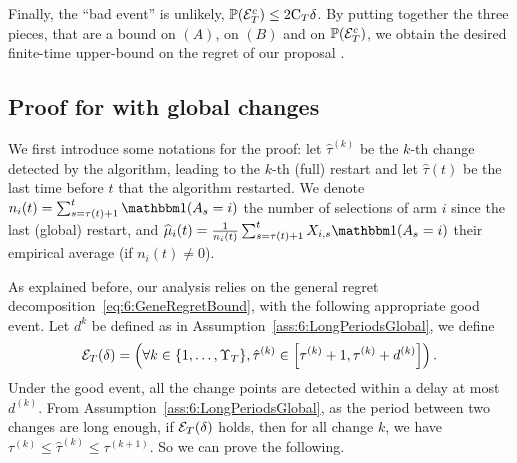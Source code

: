 Finally, the ``bad event'' is unlikely, $\mathbb{P}(\mathcal{E}_T^c) \leq 2\mathrm{C}_T \delta$.
By putting together the three pieces, that are a bound on $(A)$, on $(B)$ and on $\mathbb{P}(\mathcal{E}_T^c)$, we obtain the desired finite-time upper-bound on the regret of our proposal \GLRklUCB.





\subsection{Proof for \GLRklUCB{} with global changes}
\label{proof:6:mainRegretBoundGlobal}





We first introduce some notations for the proof:
let $\widehat{\tau}^{(k)}$ be the $k$-th change detected by the algorithm, leading to the $k$-th (full) restart and let $\widehat{\tau}(t)$ be the last time before $t$ that the algorithm restarted.
We denote $n_i(t) = \sum_{s=\tau(t)+1}^{t}\indic(A_s = i)$ the number of selections of arm $i$ since the last (global) restart, and $\widehat{\mu}_i(t) = \frac{1}{n_i(t)}\sum_{s=\tau(t)+1}^{t}X_{i,s}\indic(A_s = i)$ their empirical average (if $n_i(t) \neq 0$).

As explained before, our analysis relies on the general regret decomposition~\eqref{eq:6:GeneRegretBound}, with the following appropriate good event. Let $d^k$ be defined as in Assumption~\ref{ass:6:LongPeriodsGlobal}, we define
\begin{equation}\mathcal{E}_T(\delta) = \left( \forall k \in \{1, \ldots, \Upsilon_T\}, \hat{\tau}^{(k)} \in \left[\tau^{(k)} + 1, \tau^{(k)} + d^{(k)}\right] \right).\label{def:6:GoodEvenGlobal}\end{equation}
Under the good event, all the change points are detected within a delay at most $d^(k)$.
%
From Assumption~\ref{ass:6:LongPeriodsGlobal}, as the period between two changes are long enough, if $\mathcal{E}_T(\delta)$ holds, then for all change $k$, we have $\tau^{(k)} \leq \hat{\tau}^{(k)} \leq \tau^{(k+1)}$.
So we can prove the following.

